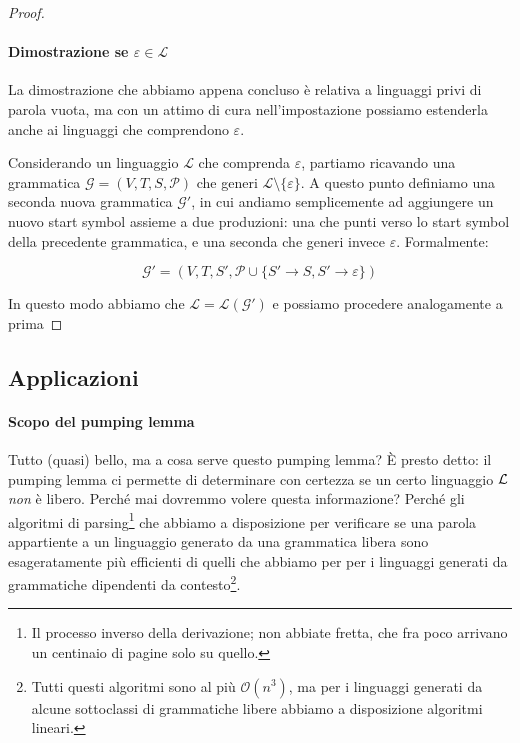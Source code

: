 \documentclass[class=book, crop=false, oneside, 12pt]{standalone}
\begin{document}
\begin{proof}
   \paragraph{Dimostrazione se \(\varepsilon \in \mathcal{L}\)}
   La dimostrazione che abbiamo appena concluso è relativa a linguaggi privi di parola vuota, ma con un attimo di cura nell'impostazione possiamo estenderla anche ai linguaggi che comprendono \(\varepsilon\).

   Considerando un linguaggio \(\mathcal{L}\) che comprenda \(\varepsilon\), partiamo ricavando una grammatica \(\mathcal{G} = (V, T, S, \mathcal{P})\) che generi \(\mathcal{L} \setminus \{\varepsilon\}\). A questo punto definiamo una seconda nuova grammatica \(\mathcal{G}'\), in cui andiamo semplicemente ad aggiungere un nuovo start symbol assieme a due produzioni: una che punti verso lo start symbol della precedente grammatica, e una seconda che generi invece \(\varepsilon\). Formalmente:

   \begin{equation*}
     \mathcal{G}' = (V, T, S', \mathcal{P} \cup \{ S' \rightarrow S, S' \rightarrow \varepsilon \})
   \end{equation*}

   In questo modo abbiamo che \(\mathcal{L} = \mathcal{L(G')}\) e possiamo procedere analogamente a prima

\end{proof}

\subsection{Applicazioni}
  \paragraph{Scopo del pumping lemma}
  Tutto (quasi) bello, ma a cosa serve questo pumping lemma? È presto detto: il pumping lemma ci permette di determinare con certezza se un certo linguaggio \(\mathcal{L}\) \emph{non} è libero. Perché mai dovremmo volere questa informazione? Perché gli algoritmi di parsing\footnote{Il processo inverso della derivazione; non abbiate fretta, che fra poco arrivano un centinaio di pagine solo su quello.} che abbiamo a disposizione per verificare se una parola appartiente a un linguaggio generato da una grammatica libera sono esageratamente più efficienti di quelli che abbiamo per per i linguaggi generati da grammatiche dipendenti da contesto\footnote{Tutti questi algoritmi sono al più \(\mathcal{O}(n^3)\), ma per i linguaggi generati da alcune sottoclassi di grammatiche libere abbiamo a disposizione algoritmi lineari.}.
\end{document}
